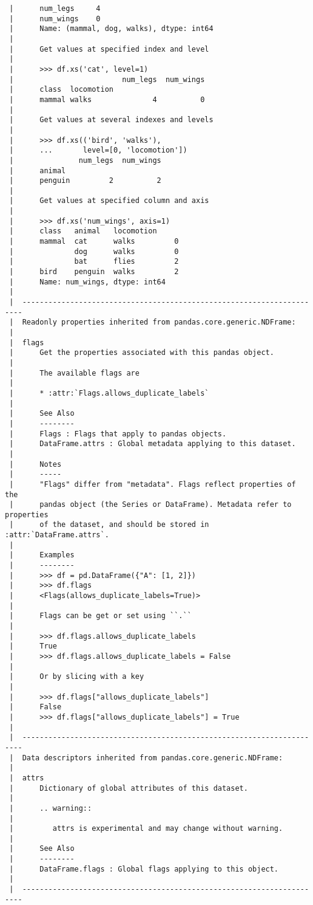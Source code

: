 \documentclass[
  letterpaper,
  DIV=11,
  numbers=noendperiod]{scrreprt}
\begin{document}
\begin{verbatim}
 |      num_legs     4
 |      num_wings    0
 |      Name: (mammal, dog, walks), dtype: int64
 |      
 |      Get values at specified index and level
 |      
 |      >>> df.xs('cat', level=1)
 |                         num_legs  num_wings
 |      class  locomotion
 |      mammal walks              4          0
 |      
 |      Get values at several indexes and levels
 |      
 |      >>> df.xs(('bird', 'walks'),
 |      ...       level=[0, 'locomotion'])
 |               num_legs  num_wings
 |      animal
 |      penguin         2          2
 |      
 |      Get values at specified column and axis
 |      
 |      >>> df.xs('num_wings', axis=1)
 |      class   animal   locomotion
 |      mammal  cat      walks         0
 |              dog      walks         0
 |              bat      flies         2
 |      bird    penguin  walks         2
 |      Name: num_wings, dtype: int64
 |  
 |  ----------------------------------------------------------------------
 |  Readonly properties inherited from pandas.core.generic.NDFrame:
 |  
 |  flags
 |      Get the properties associated with this pandas object.
 |      
 |      The available flags are
 |      
 |      * :attr:`Flags.allows_duplicate_labels`
 |      
 |      See Also
 |      --------
 |      Flags : Flags that apply to pandas objects.
 |      DataFrame.attrs : Global metadata applying to this dataset.
 |      
 |      Notes
 |      -----
 |      "Flags" differ from "metadata". Flags reflect properties of the
 |      pandas object (the Series or DataFrame). Metadata refer to properties
 |      of the dataset, and should be stored in :attr:`DataFrame.attrs`.
 |      
 |      Examples
 |      --------
 |      >>> df = pd.DataFrame({"A": [1, 2]})
 |      >>> df.flags
 |      <Flags(allows_duplicate_labels=True)>
 |      
 |      Flags can be get or set using ``.``
 |      
 |      >>> df.flags.allows_duplicate_labels
 |      True
 |      >>> df.flags.allows_duplicate_labels = False
 |      
 |      Or by slicing with a key
 |      
 |      >>> df.flags["allows_duplicate_labels"]
 |      False
 |      >>> df.flags["allows_duplicate_labels"] = True
 |  
 |  ----------------------------------------------------------------------
 |  Data descriptors inherited from pandas.core.generic.NDFrame:
 |  
 |  attrs
 |      Dictionary of global attributes of this dataset.
 |      
 |      .. warning::
 |      
 |         attrs is experimental and may change without warning.
 |      
 |      See Also
 |      --------
 |      DataFrame.flags : Global flags applying to this object.
 |  
 |  ----------------------------------------------------------------------

\end{verbatim}
\end{document}
